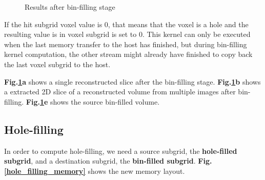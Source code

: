 \documentclass[12pt,journal,compsoc]{IEEEtran}
\begin{document}
\begin{figure}
\label{bad_grid}
\hfill
{}
\label{reconstructed_pnn_volume}
\hfill
{}
\label{cartilage_volume}
\hfill
\caption{Results after bin-filling stage}
\label{pnn_image_group}
\end{figure}


If the hit subgrid voxel value is 0, that means that the voxel is a hole and the resulting value is in voxel subgrid is set to 0.
This kernel can only be executed when the last memory transfer to the host has finished, but during bin-filling kernel computation, the other stream might already have finished to copy back the last voxel subgrid to the host.\par
\textbf{Fig.\ref{pnn_image_group}a} shows a single reconstructed slice after the bin-filling stage. \textbf{Fig.\ref{pnn_image_group}b} shows a extracted 2D slice of a reconstructed volume from multiple images after bin-filling. \textbf{Fig.\ref{pnn_image_group}e} shows the source bin-filled volume.

\subsection{Hole-filling}

In order to compute hole-filling, we need a source subgrid, the \textbf{hole-filled subgrid}, and a destination subgrid, the \textbf{bin-filled subgrid}. \textbf{Fig.\ref{hole_filling_memory}} shows the new memory layout.
\end{document}
